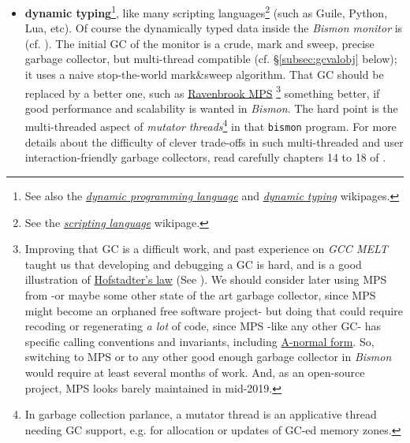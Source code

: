 \begin{itemize}
  \item \textbf{dynamic typing}\footnote{See also the
    \href{https://en.wikipedia.org/wiki/Dynamic\_programming\_language}{\emph{dynamic
        programming language}} and
    \href{https://en.wikipedia.org/wiki/Dynamic\_typing}{\emph{dynamic
        typing}} wikipages.}, like many scripting
    languages\footnote{See the
      \href{https://en.wikipedia.org/wiki/Scripting_language}{\emph{scripting
          language}} wikipage.} (such as Guile, Python, Lua, etc). Of
    course the dynamically typed data inside the \textit{Bismon
      monitor} is  (cf. \cite{Jones:2016:GC-handbook}). The initial
    GC of the monitor is a crude, mark and sweep, precise garbage
    collector, but multi-thread compatible (cf. \S\ref{subsec:gcvalobj}
    below); it uses a naive stop-the-world mark\&sweep algorithm. That
    GC should be replaced by a better one, such as
    \href{https://www.ravenbrook.com/project/mps/}{Ravenbrook MPS}
    \footnote{\label{fn:initial-gc} Improving that GC is a difficult
      work, and past experience on \emph{GCC MELT} taught us that
      developing and debugging a GC is hard, and is a good
      illustration of
      \href{https://en.wikipedia.org/wiki/Hofstadter's_law}{Hofstadter's
        law} (See \cite{Hofstadter:1979:GEB}). We should consider
      later using MPS from
       -or maybe some
      other state of the art garbage collector, since MPS might become
      an orphaned free software project- but doing that could require
      recoding or regenerating \emph{a lot} of code, since MPS -like
      any other GC- has specific calling conventions and invariants,
      including
      \href{https://en.wikipedia.org/wiki/A-normal_form}{A-normal
        form}. So, switching to MPS or to any other good enough
      garbage collector in \emph{Bismon} would require at least
      several months of work. And, as an open-source project, MPS
      looks barely maintained in mid-2019.}  something better, if good
    performance and scalability is wanted in \emph{Bismon}. The hard
    point is the multi-threaded aspect of \emph{mutator
      threads}\footnote{In garbage collection parlance, a mutator
      thread is an applicative thread needing GC support, e.g. for
      allocation or updates of GC-ed memory zones.} in that \texttt{bismon}
    program. For more details about the difficulty of clever
    trade-offs in such multi-threaded and user interaction-friendly
    garbage collectors, read carefully chapters 14 to 18 of
    \cite{Jones:2016:GC-handbook}.


\end{itemize}

